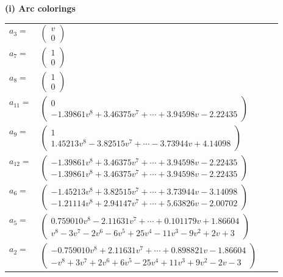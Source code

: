 \documentclass[1p]{elsarticle_modified}
\theoremstyle{definition}
\begin{document}
\flushleft \textbf{(i) Arc colorings}\\
\begin{tabular}{m{7pt} m{180pt} m{7pt} m{180pt} }
\flushright $a_{3}=$&$\begin{pmatrix}v\\0\end{pmatrix}$ \\
\flushright $a_{7}=$&$\begin{pmatrix}1\\0\end{pmatrix}$ \\
\flushright $a_{8}=$&$\begin{pmatrix}1\\0\end{pmatrix}$ \\
\flushright $a_{11}=$&$\begin{pmatrix}0\\-1.39861 v^{8}+3.46375 v^{7}+\cdots+3.94598 v-2.22435\end{pmatrix}$ \\
\flushright $a_{9}=$&$\begin{pmatrix}1\\1.45213 v^{8}-3.82515 v^{7}+\cdots-3.73944 v+4.14098\end{pmatrix}$ \\
\flushright $a_{12}=$&$\begin{pmatrix}-1.39861 v^{8}+3.46375 v^{7}+\cdots+3.94598 v-2.22435\\-1.39861 v^{8}+3.46375 v^{7}+\cdots+3.94598 v-2.22435\end{pmatrix}$ \\
\flushright $a_{6}=$&$\begin{pmatrix}-1.45213 v^{8}+3.82515 v^{7}+\cdots+3.73944 v-3.14098\\-1.21114 v^{8}+2.94147 v^{7}+\cdots+5.63826 v-2.00702\end{pmatrix}$ \\
\flushright $a_{5}=$&$\begin{pmatrix}0.759010 v^{8}-2.11631 v^{7}+\cdots+0.101179 v+1.86604\\v^8-3 v^7-2 v^6-6 v^5+25 v^4-11 v^3-9 v^2+2 v+3\end{pmatrix}$ \\
\flushright $a_{2}=$&$\begin{pmatrix}-0.759010 v^{8}+2.11631 v^{7}+\cdots+0.898821 v-1.86604\\- v^8+3 v^7+2 v^6+6 v^5-25 v^4+11 v^3+9 v^2-2 v-3\end{pmatrix}$ \\

\end{tabular}
\end{document}
